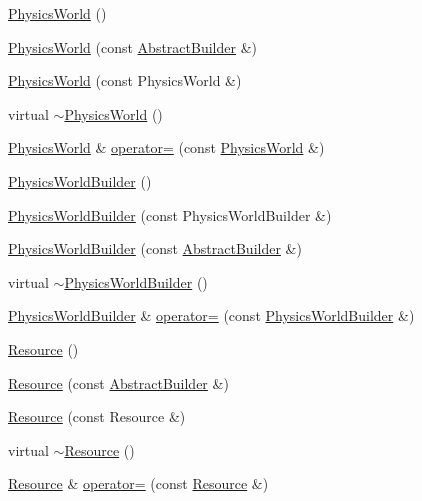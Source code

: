\begin{DoxyCompactItemize}
\item 
\hyperlink{namespacejli_a84f1f097c95cf1e48c0df5bec2f2b262}{Physics\+World} ()
\item 
\hyperlink{namespacejli_ad987fadc433080865f227046a5f33d25}{Physics\+World} (const \hyperlink{classjli_1_1_abstract_builder}{Abstract\+Builder} \&)
\item 
\hyperlink{namespacejli_a8aed3494aa3e6d4360421e5b935c5b94}{Physics\+World} (const Physics\+World \&)
\item 
virtual \hyperlink{namespacejli_a1ac2ddeeb10a25593e741142a7d1524e}{$\sim$\+Physics\+World} ()
\item 
\hyperlink{namespacejli_a84f1f097c95cf1e48c0df5bec2f2b262}{Physics\+World} \& \hyperlink{namespacejli_af199e55a0897e5102c8314f78c34775c}{operator=} (const \hyperlink{namespacejli_a84f1f097c95cf1e48c0df5bec2f2b262}{Physics\+World} \&)
\item 
\hyperlink{namespacejli_aa97fa0da471fb9eb0a9d7db6acd73389}{Physics\+World\+Builder} ()
\item 
\hyperlink{namespacejli_a48223b78110a9d35f603997bd29107cf}{Physics\+World\+Builder} (const Physics\+World\+Builder \&)
\item 
\hyperlink{namespacejli_a6ccccef1adeea86e63074e58e0c2f6cc}{Physics\+World\+Builder} (const \hyperlink{classjli_1_1_abstract_builder}{Abstract\+Builder} \&)
\item 
virtual \hyperlink{namespacejli_aee777c7761e80a169373be5f6d1f2c58}{$\sim$\+Physics\+World\+Builder} ()
\item 
\hyperlink{namespacejli_aa97fa0da471fb9eb0a9d7db6acd73389}{Physics\+World\+Builder} \& \hyperlink{namespacejli_a4f5fac6387bb41472fedc1ff5cf86955}{operator=} (const \hyperlink{namespacejli_aa97fa0da471fb9eb0a9d7db6acd73389}{Physics\+World\+Builder} \&)
\item 
\hyperlink{namespacejli_a4726f256ac2f44778dafed297f23afd8}{Resource} ()
\item 
\hyperlink{namespacejli_a9ad3207aaa7ced8efc757bbb0464a0d7}{Resource} (const \hyperlink{classjli_1_1_abstract_builder}{Abstract\+Builder} \&)
\item 
\hyperlink{namespacejli_a81283b9d009d7035c20bcc160a4093ce}{Resource} (const Resource \&)
\item 
virtual \hyperlink{namespacejli_aea5d50a87798b1ed6aa82171cb6f666d}{$\sim$\+Resource} ()
\item 
\hyperlink{namespacejli_a4726f256ac2f44778dafed297f23afd8}{Resource} \& \hyperlink{namespacejli_aa42f10f677bd4750e4a4e5ece8523ab0}{operator=} (const \hyperlink{namespacejli_a4726f256ac2f44778dafed297f23afd8}{Resource} \&)

\end{DoxyCompactItemize}
